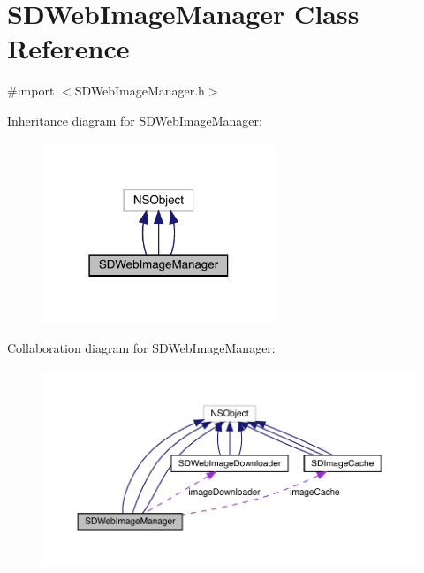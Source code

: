 \hypertarget{interface_s_d_web_image_manager}{}\section{S\+D\+Web\+Image\+Manager Class Reference}
\label{interface_s_d_web_image_manager}


{\ttfamily \#import $<$S\+D\+Web\+Image\+Manager.\+h$>$}



Inheritance diagram for S\+D\+Web\+Image\+Manager\+:\nopagebreak
\begin{figure}[H]
\begin{center}
\leavevmode
\includegraphics[width=198pt]{interface_s_d_web_image_manager__inherit__graph}
\end{center}
\end{figure}


Collaboration diagram for S\+D\+Web\+Image\+Manager\+:\nopagebreak
\begin{figure}[H]
\begin{center}
\leavevmode
\includegraphics[width=350pt]{interface_s_d_web_image_manager__coll__graph}
\end{center}
\end{figure}
